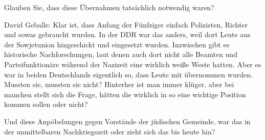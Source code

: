 Glauben Sie, dass diese Übernahmen tatsächlich notwendig waren? 

David Geballe: Klar ist, dass Anfang der Fünfziger einfach Polizisten, Richter und sowas gebraucht wurden. In der DDR war das anders, weil dort Leute aus der Sowjetunion hingeschickt und eingesetzt wurden. Inzwischen gibt es historische Nachforschungen, laut denen auch dort nicht alle Beamten und Parteifunktionäre während der Nazizeit eine wirklich weiße Weste hatten. Aber es war in beiden Deutschlands eigentlich so, dass Leute mit übernommen wurden. Mussten sie, mussten sie nicht? Hinterher ist man immer klüger, aber bei manchen stellt sich die Frage, hätten die wirklich in so eine wichtige Position kommen sollen oder nicht? 

Und diese Anpöbelungen gegen Vorstände der jüdischen Gemeinde, war das in der unmittelbaren Nachkriegszeit oder zieht sich das bis heute hin? 

